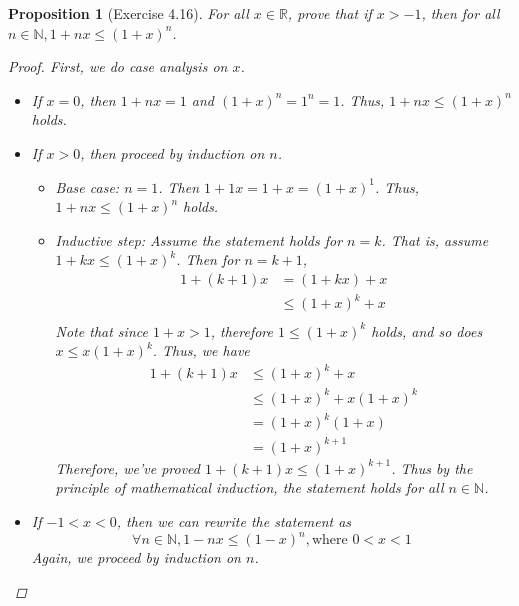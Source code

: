 \documentclass[12pt]{article}
\newcommand{\N}{\mathbb{N}} %
\newcommand{\R}{\mathbb{R}} %
\newtheorem{proposition}{Proposition}
\begin{document}
\begin{proposition}[Exercise 4.16]
  For all $x \in \R$, prove that if $x > -1$, then for all $n \in \N, 1 + nx \le (1 + x)^n$.
  \begin{proof}
    First, we do case analysis on $x$.
    \begin{itemize}
      \item If $x = 0$, then $1 + nx = 1$ and $(1 + x)^n = 1^n = 1$.
            Thus, $1 + nx \le (1 + x)^n$ holds.
      \item If $x > 0$, then proceed by induction on $n$.
            \begin{itemize}
              \item Base case: $n = 1$. Then $1 + 1x = 1 + x = (1 + x)^1$.
                    Thus, $1 + nx \le (1 + x)^n$ holds.
              \item Inductive step: Assume the statement holds for $n = k$.
                    That is, assume $1 + kx \le (1 + x)^k$.
                    Then for $n = k + 1$,
                    \begin{align*}
                      1 + (k + 1)x & = (1 + kx) + x    \\
                                   & \le (1 + x)^k + x \\
                    \end{align*}
                    Note that since $1 + x > 1$, therefore $1 \le (1 + x)^k$ holds, and so does $x \le x(1 + x)^k$.
                    Thus, we have
                    \begin{align*}
                      1 + (k + 1)x & \le (1 + x)^k + x          \\
                                   & \le (1 + x)^k + x(1 + x)^k \\
                                   & = (1 + x)^k(1 + x)         \\
                                   & = (1 + x)^{k + 1}
                    \end{align*}
                    Therefore, we've proved $1 + (k + 1)x \le (1 + x)^{k + 1}$.
                    Thus by the principle of mathematical induction, the statement holds for all $n \in \N$.
            \end{itemize}
      \item If $-1 < x < 0$, then we can rewrite the statement as
            \[
              \forall n \in \N, 1 - nx \le (1 - x)^n, \text{where } 0 < x < 1
            \]
            Again, we proceed by induction on $n$.
            \begin{itemize}

\end{itemize}
\end{itemize}
\end{proof}
\end{proposition}
\end{document}
